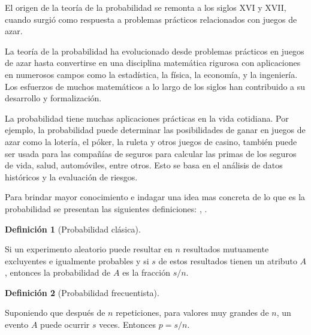 \documentclass[
  us-letterpaper,
]{scrreprt}
\theoremstyle{plain}
\theoremstyle{plain}
\theoremstyle{definition}
\newtheorem{definition}{Definición}[chapter]
\theoremstyle{remark}
\begin{document}
El origen de la teoría de la probabilidad se remonta a los siglos XVI y
XVII, cuando surgió como respuesta a problemas prácticos relacionados
con juegos de azar.

La teoría de la probabilidad ha evolucionado desde problemas prácticos
en juegos de azar hasta convertirse en una disciplina matemática
rigurosa con aplicaciones en numerosos campos como la estadística, la
física, la economía, y la ingeniería. Los esfuerzos de muchos
matemáticos a lo largo de los siglos han contribuido a su desarrollo y
formalización.

La probabilidad tiene muchas aplicaciones prácticas en la vida
cotidiana. Por ejemplo, la probabilidad puede determinar las
posibilidades de ganar en juegos de azar como la lotería, el póker, la
ruleta y otros juegos de casino, también puede ser usada para las
compañías de seguros para calcular las primas de los seguros de vida,
salud, automóviles, entre otros. Esto se basa en el análisis de datos
históricos y la evaluación de riesgos.

Para brindar mayor conocimiento e indagar una idea mas concreta de lo
que es la probabilidad se presentan las siguientes definiciones:
\textcite{castaneda2004probabilidad}, \textcite{ross2014introduction}.

\begin{definition}[Probabilidad
clásica]\protect\hypertarget{def-pclas}{}\label{def-pclas}

Si un experimento aleatorio puede resultar en \(n\) resultados
mutuamente excluyentes e igualmente probables y si \(s\) de estos
resultados tienen un atributo \(A\), entonces la probabilidad de \(A\)
es la fracción \(s/n\).

\end{definition}

\begin{definition}[Probabilidad
frecuentista]\protect\hypertarget{def-pfrec}{}\label{def-pfrec}

Suponiendo que después de \(n\) repeticiones, para valores muy grandes
de \(n\), un evento \(A\) puede ocurrir \(s\) veces. Entonces \(p=s/n\).

\end{definition}
\end{document}
